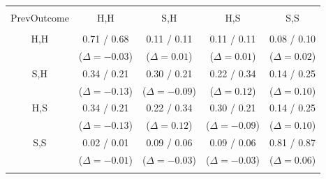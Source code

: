 \small
\begin{tabular}{@{\extracolsep{7pt}} ccccc}
\\[-1.8ex]\hline
\hline \\[-1.8ex]
PrevOutcome & H,H & S,H & H,S & S,S \\
\hline \\[-1.1ex]
H,H & 0.71 / 0.68 & 0.11 / 0.11 & 0.11 / 0.11 & 0.08 / 0.10 \\
& ($\Delta = -0.03$) & ($\Delta = 0.01$) & ($\Delta = 0.01$) & ($\Delta = 0.02$) \\[1.2ex]
S,H & 0.34 / 0.21 & 0.30 / 0.21 & 0.22 / 0.34 & 0.14 / 0.25 \\
& ($\Delta = -0.13$) & ($\Delta = -0.09$) & ($\Delta = 0.12$) & ($\Delta = 0.10$) \\[1.2ex]
H,S & 0.34 / 0.21 & 0.22 / 0.34 & 0.30 / 0.21 & 0.14 / 0.25 \\
& ($\Delta = -0.13$) & ($\Delta = 0.12$) & ($\Delta = -0.09$) & ($\Delta = 0.10$) \\[1.2ex]
S,S & 0.02 / 0.01 & 0.09 / 0.06 & 0.09 / 0.06 & 0.81 / 0.87 \\
& ($\Delta = -0.01$) & ($\Delta = -0.03$) & ($\Delta = -0.03$) & ($\Delta = 0.06$) \\
\hline \\[-1.1ex]
\end{tabular}

